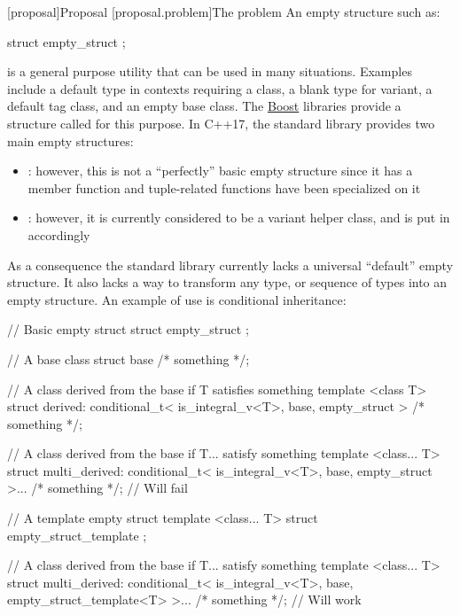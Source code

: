 \documentclass[ebook,10pt,oneside,openany,final]{memoir}
\begin{document}
\setcounter{tocdepth}{2}
\hypertarget{toctarget}{\tableofcontents*}
\mainmatter
\setglobalstyles
[proposal]{Proposal}
[proposal.problem]{The problem}
An empty structure such as:
\begin{codeblock}
struct empty_struct {};
\end{codeblock}
is a general purpose utility that can be used in many situations. Examples include a default type in contexts requiring a class, a blank type for variant, a default tag class, and an empty base class. The \href{https://www.boost.org/doc/libs/1_67_0/boost/blank.hpp}{Boost} libraries provide a structure called  for this purpose. In C++17, the standard library provides two main empty structures:
\begin{itemize}
\item {}: however, this is not a ``perfectly'' basic empty structure since it has a member function  and tuple-related functions have been specialized on it
\item {}: however, it is currently considered to be a variant helper class, and is put in  accordingly
\end{itemize}
As a consequence the standard library currently lacks a universal ``default'' empty structure. It also lacks a way to transform any type, or sequence of types into an empty structure. An example of use is conditional inheritance:
\begin{codeblock}
// Basic empty struct
struct empty_struct {};

// A base class
struct base {/* something */};

// A class derived from the base if T satisfies something
template <class T>
struct derived: conditional_t<
    is_integral_v<T>,
    base,
    empty_struct
> {/* something */};

// A class derived from the base if T... satisfy something
template <class... T>
struct multi_derived: conditional_t<
    is_integral_v<T>,
    base,
    empty_struct
>... {/* something */}; // Will fail

// A template empty struct
template <class... T>
struct empty_struct_template {};

// A class derived from the base if T... satisfy something
template <class... T>
struct multi_derived: conditional_t<
    is_integral_v<T>,
    base,
    empty_struct_template<T>
>... {/* something */}; // Will work
\end{codeblock}
\end{document}
